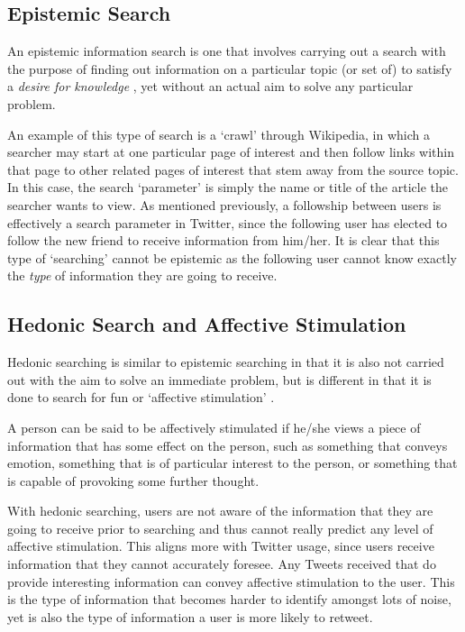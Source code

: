 \subsection{Epistemic Search}
An epistemic information search is one that involves carrying out a search with the purpose of finding out information on a particular topic (or set of) to satisfy a \textit{desire for knowledge} \cite{xu07}, yet without an actual aim to solve any particular problem.

An example of this type of search is a `crawl' through Wikipedia, in which a searcher may start at one particular page of interest and then follow links within that page to other related pages of interest that stem away from the source topic. In this case, the search `parameter' is simply the name or title of the article the searcher wants to view. As mentioned previously, a followship between users is effectively a search parameter in Twitter, since the following user has elected to follow the new friend to receive information from him/her. It is clear that this type of `searching' cannot be epistemic as the following user cannot know exactly the \textit{type} of information they are going to receive.

\subsection{Hedonic Search and Affective Stimulation}
\label{section:affective_stimulation}
Hedonic searching is similar to epistemic searching in that it is also not carried out with the aim to solve an immediate problem, but is different in that it is done to search for fun or `affective stimulation' \cite{xu07}.

A person can be said to be affectively stimulated if he/she views a piece of information that has some effect on the person, such as something that conveys emotion, something that is of particular interest to the person, or something that is capable of provoking some further thought.

With hedonic searching, users are not aware of the information that they are going to receive prior to searching and thus cannot really predict any level of affective stimulation. This aligns more with Twitter usage, since users receive information that they cannot accurately foresee. Any Tweets received that do provide interesting information can convey affective stimulation to the user. This is the type of information that becomes harder to identify amongst lots of noise, yet is also the type of information a user is more likely to retweet.


